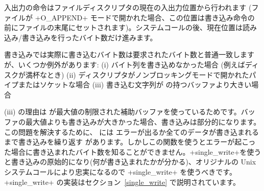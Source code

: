 入出力の命令はファイルディスクリプタの現在の入出力位置から行われます (ファイルが \ml+O_APPEND+ モードで開かれた場合、この位置は書き込み命令の前にファイルの末尾にセットされます)。システムコールの後、現在位置は読み込み/書き込みを行ったバイト数だけ進みます。


書き込みでは実際に書き込むバイト数は要求されたバイト数と普通一致しますが、いくつか例外があります:
(i) バイト列を書き込めなかった場合 (例えばディスクが満杯なとき)
(ii) ディスクリプタがノンブロッキングモードで開かれたパイプまたはソケットな場合
(iii) 書き込む文字列が \ocaml の持つバッファより大きい場合

(iii) の理由は \ocaml が最大値の制限された補助バッファを使っているためです。バッファの最大値よりも書き込みが大きかった場合、書き込みは部分的になります。この問題を解決するために、 \ocaml には エラーが出るか全てのデータが書き込まれるまで書き込みを繰り返す  があります。しかしこの関数を使うとエラーが起こった場合に書き込まれたバイト数を知ることができません。\ml+single_write+を使うと書き込みの原始的になり(何が書き込まれたかが分かる)、オリジナルの Unix システムコールにより忠実になるので \ml+single_write+ を使うべきです。\ml+single_write+ の実装はセクション~\ref{single_write} で説明されています。


